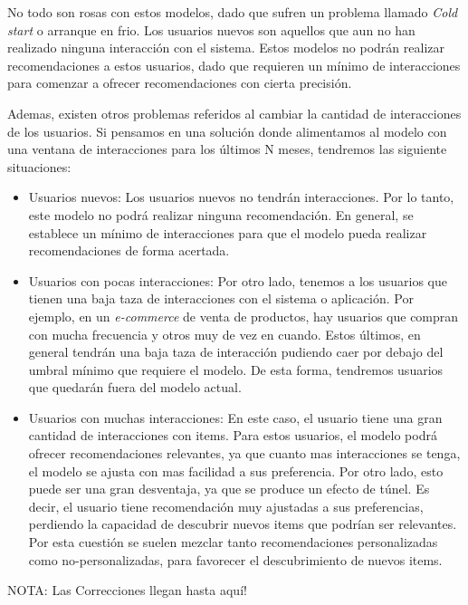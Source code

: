 \documentclass[11pt,a4paper,twoside]{thesis}
\begin{document}
No todo son rosas con estos modelos, dado que sufren un problema llamado
\textit{Cold start} o arranque en frio. Los usuarios nuevos son aquellos que
aun no han realizado ninguna interacción con el sistema. Estos modelos no
podrán realizar recomendaciones a estos usuarios, dado que requieren un mínimo
de interacciones para comenzar a ofrecer recomendaciones con cierta precisión.

Ademas, existen otros problemas referidos al cambiar la cantidad de
interacciones de los usuarios. Si pensamos en una solución donde alimentamos al
modelo con una ventana de interacciones para los últimos N meses, tendremos las
siguiente situaciones:

\begin{itemize}
	\item Usuarios nuevos: Los usuarios nuevos no tendrán interacciones. Por lo tanto,
	      este modelo no podrá realizar ninguna recomendación. En general, se establece
	      un mínimo de interacciones para que el modelo pueda realizar recomendaciones de
	      forma acertada.
	\item Usuarios con pocas interacciones: Por otro lado, tenemos a los usuarios que
	      tienen una baja taza de interacciones con el sistema o aplicación. Por ejemplo,
	      en un \textit{e-commerce} de venta de productos, hay usuarios que compran con
	      mucha frecuencia y otros muy de vez en cuando. Estos últimos, en general
	      tendrán una baja taza de interacción pudiendo caer por debajo del umbral mínimo
	      que requiere el modelo. De esta forma, tendremos usuarios que quedarán fuera
	      del modelo actual.
	\item Usuarios con muchas interacciones: En este caso, el usuario tiene una gran
	      cantidad de interacciones con items. Para estos usuarios, el modelo podrá
	      ofrecer recomendaciones relevantes, ya que cuanto mas interacciones se tenga,
	      el modelo se ajusta con mas facilidad a sus preferencia. Por otro lado, esto
	      puede ser una gran desventaja, ya que se produce un efecto de túnel. Es decir,
	      el usuario tiene recomendación muy ajustadas a sus preferencias, perdiendo la
	      capacidad de descubrir nuevos items que podrían ser relevantes. Por esta
	      cuestión se suelen mezclar tanto recomendaciones personalizadas como
	      no-personalizadas, para favorecer el descubrimiento de nuevos items.

\end{itemize}


NOTA: Las Correcciones  llegan hasta aquí!
\end{document}
